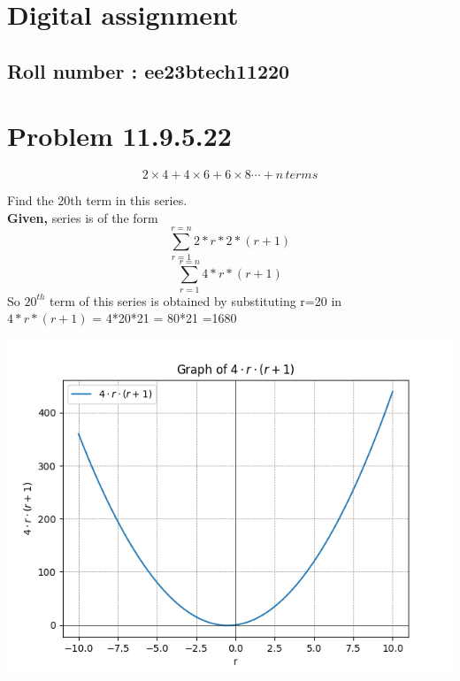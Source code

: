\documentclass[12pt]{article}
\begin{document}
\section*{Digital assignment}
\subsection*{Roll number : ee23btech11220}


\section{\textbf{Problem 11.9.5.22}}
$$2\times4+4\times6+6\times8\cdots+n\,terms$$ 


Find the 20th term in this series.\\

\textbf{Given,}
series is of the form
\begin{equation}
\sum_{r=1}^{r=n} 2*r*2*(r+1)
\end{equation}
\begin{equation}
\sum_{r=1}^{r=n} 4*r*(r+1)
\end{equation}
So $20^{th}$ term of this series is obtained by substituting r=20 in\\ $4*r*(r+1)$
= 4*20*21
= 80*21
=1680

\includegraphics[scale=0.8]{assignments/digital2/graphs/graph2.png}
\end{document}
